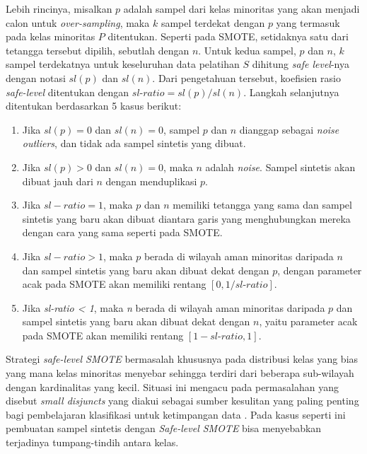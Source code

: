 Lebih rincinya, misalkan $ p $ adalah sampel dari kelas minoritas yang akan
menjadi calon untuk \textit{over-sampling}, maka $ k $ sampel terdekat dengan
$ p $ yang termasuk pada kelas minoritas $ P $ ditentukan.
Seperti pada SMOTE, setidaknya satu dari tetangga tersebut dipilih, sebutlah
dengan $ n $.
Untuk kedua sampel, $ p $ dan $ n $, $ k $ sampel terdekatnya untuk keseluruhan
data pelatihan $ S $ dihitung \textit{safe level}-nya dengan notasi $ sl(p) $
dan $ sl(n) $.
Dari pengetahuan tersebut, koefisien rasio \textit{safe-level} ditentukan
dengan $ \textit{sl-ratio} = sl(p) / sl(n) $.
Langkah selanjutnya ditentukan berdasarkan 5 kasus berikut:
\begin{enumerate}
	\item \label{case:safe-1} Jika $ sl(p) = 0 $ dan $ sl(n) = 0 $, sampel
	$ p $ dan $ n $ dianggap sebagai \textit{noise outliers}, dan tidak ada
	sampel sintetis yang dibuat.
	\item Jika $ sl(p) > 0 $ dan $ sl(n) = 0 $, maka $ n $
	adalah \textit{noise}.
	Sampel sintetis akan dibuat jauh dari $ n $ dengan menduplikasi $ p $.
	\item Jika $ sl-ratio = 1 $, maka $ p $ dan $ n $ memiliki tetangga
	yang sama dan sampel sintetis yang baru akan dibuat diantara garis yang
	menghubungkan mereka dengan cara yang sama seperti pada SMOTE.
	\item Jika $ sl-ratio > 1 $, maka $ p $ berada di wilayah
	aman minoritas daripada $ n $ dan sampel sintetis yang baru akan
	dibuat dekat dengan $ p $, dengan parameter acak pada SMOTE akan
	memiliki rentang $ [0, 1 / \textit{sl-ratio}] $.
	\item Jika \textit{sl-ratio < 1}, maka \textit{n} berada di wilayah
	aman minoritas daripada $ p $ dan sampel sintetis yang baru akan
	dibuat dekat dengan $ n $, yaitu parameter acak pada SMOTE akan
	memiliki rentang $ [1 - \textit{sl-ratio}, 1] $.
\end{enumerate}

Strategi \textit{safe-level SMOTE} bermasalah khususnya pada distribusi kelas
yang bias yang mana kelas minoritas menyebar sehingga terdiri dari beberapa
sub-wilayah dengan kardinalitas yang kecil.
Situasi ini mengacu pada permasalahan yang disebut \textit{small disjuncts}
yang diakui sebagai sumber kesulitan yang paling penting bagi pembelajaran
klasifikasi untuk ketimpangan data \cite{jo2004class}.
Pada kasus seperti ini pembuatan sampel sintetis dengan \textit{Safe-level
SMOTE} bisa menyebabkan terjadinya tumpang-tindih antara kelas.


